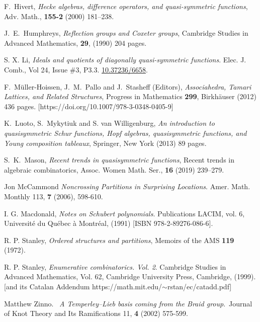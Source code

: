 \documentclass[12pt]{amsart}
\theoremstyle{definition}
\theoremstyle{remark}
\numberwithin{equation}{section}
\begin{document}
\begin{thebibliography}{99}
 F.~Hivert,
\textit{Hecke algebras, difference operators, and quasi-symmetric functions},
 {Adv. Math.},
{\bf 155-2} (2000) 181--238.

 J.~E.~Humphreys,   \textit{Reflection groups and {C}oxeter groups},
 {Cambridge Studies in Advanced Mathematics},
{\bf 29},
(1990) 204 pages.

 S. X. Li,
\textit{Ideals and quotients of diagonally quasi-symmetric functions}.
Elec. J. Comb., Vol 24, Issue \#3, P3.3.
\href{https://doi.org/10.37236/6658}{10.37236/6658}.

 F.~Müller-Hoissen, J.~M.~Pallo and J.~Stasheff  (Editors),
\textit{Associahedra, Tamari Lattices, and Related Structures},
Progress in Mathematics {\bf 299}, Birkh\"auser (2012) 436 pages.
[https://doi.org/10.1007/978-3-0348-0405-9]



K.~Luoto, S.~Mykytiuk and S. van Willigenburg,
\textit{An introduction to quasisymmetric {S}chur functions, Hopf algebras, quasisymmetric functions, and Young composition
              tableaux},
{Springer, New York}
(2013)
89 pages.
  
 S.~K.~Mason, 
\textit{Recent trends in quasisymmetric functions},
{Recent trends in algebraic combinatorics},
 {Assoc. Women Math. Ser.},
 {\bf 16} (2019) 
{239--279}.
    
 Jon McCammond
\textit{Noncrossing Partitions in Surprising Locations}.
Amer. Math. Monthly 113, {\bf 7} (2006), 598-610.

 I. G. Macdonald,
\textit{Notes on Schubert polynomials}.
Publications LACIM, vol. 6, Universit\'e du Qu\'ebec \`a Montr\'eal,  (1991) [ISBN 978-2-89276-086-6].

  R. P. Stanley, 
\textit{Ordered structures and partitions},
Memoirs of the AMS {\bf 119} (1972).

 R. P.  Stanley,
\textit{Enumerative combinatorics. {V}ol. 2}.
{Cambridge Studies in Advanced Mathematics}, Vol. {62},
{Cambridge University Press, Cambridge}, (1999). [and its {Catalan Addendum} https://math.mit.edu/$\sim$rstan/ec/catadd.pdf]

  Matthew Zinno.  \textit{A Temperley--Lieb basis coming from the Braid group}. Journal of Knot Theory and Its Ramifications 11, {\bf 4} (2002) 575-599.

\end{thebibliography}
\end{document}
